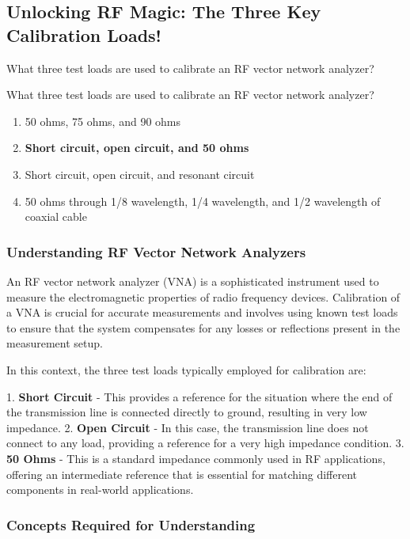 \subsection{Unlocking RF Magic: The Three Key Calibration Loads!}

What three test loads are used to calibrate an RF vector network analyzer? 

\begin{tcolorbox}[colback=gray!10, colframe=black, title=E4B05]
     What three test loads are used to calibrate an RF vector network analyzer?  
\begin{enumerate}[label=\Alph*.]
    \item 50 ohms, 75 ohms, and 90 ohms
    \item \textbf{Short circuit, open circuit, and 50 ohms}
    \item Short circuit, open circuit, and resonant circuit
    \item 50 ohms through 1/8 wavelength, 1/4 wavelength, and 1/2 wavelength of coaxial cable
\end{enumerate} \end{tcolorbox}

\subsubsection{Understanding RF Vector Network Analyzers}

An RF vector network analyzer (VNA) is a sophisticated instrument used to measure the electromagnetic properties of radio frequency devices. Calibration of a VNA is crucial for accurate measurements and involves using known test loads to ensure that the system compensates for any losses or reflections present in the measurement setup.

In this context, the three test loads typically employed for calibration are:

1. \textbf{Short Circuit} - This provides a reference for the situation where the end of the transmission line is connected directly to ground, resulting in very low impedance.
2. \textbf{Open Circuit} - In this case, the transmission line does not connect to any load, providing a reference for a very high impedance condition.
3. \textbf{50 Ohms} - This is a standard impedance commonly used in RF applications, offering an intermediate reference that is essential for matching different components in real-world applications.

\subsubsection{Concepts Required for Understanding}

